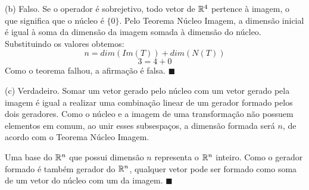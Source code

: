 \documentclass{homework}
\begin{document}
(b) Falso. Se o operador é sobrejetivo, todo vetor de $\mathbb R^4$ pertence à imagem, o que significa que o núcleo é $\{0\}$. Pelo Teorema Núcleo Imagem, a dimensão inicial é igual à soma da dimensão da imagem somada à dimensão do núcleo. Substituindo os valores obtemos: 
\[n = dim(Im(T)) + dim(N(T))\]
\[3 = 4 + 0\]
Como o teorema falhou, a afirmação é falsa. $\blacksquare$

(c) Verdadeiro. Somar um vetor gerado pelo núcleo com um vetor gerado pela imagem é igual a realizar uma combinação linear de um gerador formado pelos dois geradores. Como o núcleo e a imagem de uma transformação não possuem elementos em comum, ao unir esses subsespaços, a dimensão formada será $n$, de acordo com o Teorema Núcleo Imagem.

Uma base do $\mathbb R^n$ que possui dimensão $n$ representa o $\mathbb R^n$ inteiro. Como o gerador formado é também gerador do $\mathbb R^n$, qualquer vetor pode ser formado como soma de um vetor do núcleo com um da imagem. $\blacksquare$
\end{document}
